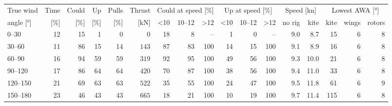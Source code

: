 \begin{tabular}{@{}lrrrrrrrrrrrrrrrr@{}}
\toprule
True wind & Time & Could & Up & Pulls & Thrust & \multicolumn{3}{c}{Could at speed [\%]} & \multicolumn{3}{c}{Up at speed [\%]} & \multicolumn{2}{c}{Speed [kn]} & \multicolumn{3}{c}{Lowest AWA [\si{\degree}]} \\
\cmidrule(lr){7-9}\cmidrule(lr){10-12}\cmidrule(lr){13-14}\cmidrule(lr){15-17}
angle [\si{\degree}] & [\%] & [\%] & [\%] & [\%] & [kN] & <10 & 10--12 & >12 & <10 & 10--12 & >12 & no rig & kite & kite & wings & rotors \\
\midrule
0--30 & 12 & 15 & 1 & 0 & \(0\) & 18 & 8 & -- & 1 & 0 & -- & 9.0 & 8.7 & 15 & 6 & 8 \\
30--60 & 11 & 86 & 15 & 14 & \(143\) & 87 & 83 & 100 & 14 & 15 & 100 & 9.1 & 8.9 & 16 & 6 & 8 \\
60--90 & 16 & 94 & 59 & 59 & \(319\) & 92 & 95 & 100 & 49 & 56 & 100 & 9.3 & 10.0 & 21 & 6 & 8 \\
90--120 & 17 & 86 & 64 & 64 & \(420\) & 70 & 87 & 100 & 38 & 56 & 100 & 9.4 & 11.0 & 33 & 6 & 8 \\
120--150 & 21 & 69 & 63 & 63 & \(522\) & 35 & 55 & 100 & 24 & 47 & 100 & 9.5 & 11.8 & 61 & 6 & 9 \\
150--180 & 23 & 46 & 43 & 43 & \(665\) & 18 & 21 & 100 & 10 & 19 & 100 & 9.7 & 11.4 & 115 & 6 & 8 \\
\bottomrule
\end{tabular}
